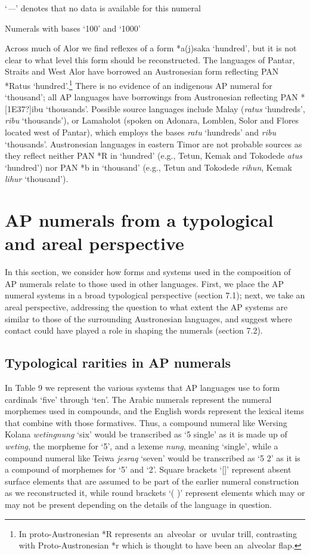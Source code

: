 {\begin{sidewaystable}
{
{\dag} `\textit{{}---}' denotes that no data is available for this numeral
}
\caption{Numerals with bases `100' and `1000'}
\end{sidewaystable}


Across much of Alor we find reflexes of a form *a(j)saka `hundred', but it is not clear to what level this form should be reconstructed. The languages of Pantar, Straits and West Alor have borrowed an Austronesian form reflecting PAN *Ratus `hundred'.\footnote{{}   In proto-Austronesian *R represents an{~}alveolar{~}or{~}uvular trill, contrasting with Proto-Austronesian *r which is thought to have been an{~}alveolar flap.} There is no evidence of an indigenous AP numeral for `thousand'; all AP languages have borrowings from Austronesian reflecting PAN *[1E37?]ibu `thousands'. Possible source languages include Malay (\textit{ratus} `hundreds', \textit{ribu} `thousands'), or Lamaholot (spoken on Adonara, Lomblen, Solor and Flores located west of Pantar), which employs the bases \textit{ratu} `hundreds' and \textit{ribu} `thousands'. Austronesian languages in eastern Timor are not probable sources as they reflect neither PAN *R in `hundred' (e.g., Tetun, Kemak and Tokodede \textit{atus} `hundred') nor PAN *b in `thousand' (e.g., Tetun and Tokodede \textit{rihun}, Kemak \textit{lihur} `thousand').

\section{AP numerals from a typological and areal perspective}
In this section, we consider how forms and systems used in the composition of AP numerals relate to those used in other languages. First, we place the AP numeral systems in a broad typological perspective (section 7.1); next, we take an areal perspective, addressing the question to what extent the AP systems are similar to those of the surrounding Austronesian languages, and suggest where contact could have played a role in shaping the numerals (section 7.2).

\subsection{Typological rarities in AP numerals}
In Table 9 we represent the various systems that AP languages use to form cardinals `five' through `ten'. The Arabic numerals represent the numeral morphemes used in compounds, and the English words represent the lexical items that combine with those formatives. Thus, a compound numeral like Wersing Kolana \textit{wetingnung}  `six' would be transcribed as `5 single' as it is made up of \textit{weting}, the morpheme for `5', and a lexeme \textit{nung}, meaning `single', while a compound numeral like Teiwa \textit{jesraq} `seven' would be transcribed as `5 2' as it is a compound of morphemes for `5' and `2'.  Square brackets `[]' represent absent surface elements that are assumed to be part of the earlier numeral construction as we reconstructed it, while round brackets `( )' represent elements which may or may not be present depending on the details of the language in question.


}
